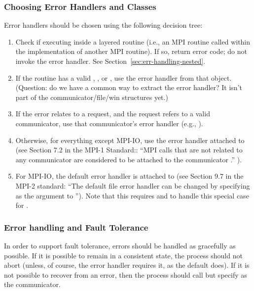\documentclass{article}
\begin{document}
\subsubsection{Choosing Error Handlers and Classes}
Error handlers should be chosen using the following decision tree:
\begin{enumerate}
\item Check if executing inside a layered routine (i.e., an MPI routine called
  within the implementation of another MPI routine).  If so, return error
  code; do not invoke the error handler.  See
  Section~\ref{sec:err-handling-nested}. 
\item If the routine has a valid , , or
  , use the error handler from that object.  (Question: do we
  have a common way to extract the error handler?  It isn't part of the
  communicator/file/win structures yet.)
\item If the error relates to a request, and the request refers to a valid
  communicator, use that communicator's error handler (e.g., ).
\item Otherwise, for everything except MPI-IO, use the error handler attached
  to   
  (see Section 7.2 in the MPI-1 Standard:: ``MPI calls that are not related to
  any communicator are considered to be attached to the communicator
  .'' ).
\item For MPI-IO, the default error handler is attached to
   (see Section 9.7 in the MPI-2 standard: ``The default
  file error handler can be changed by specifying  as the
   argument to '').  Note that this
  requires  and
   to handle this special case for
  . 
\end{enumerate}

 

\subsubsection{Error handling and Fault Tolerance}
\label{sec:errs-and-faults}
In order to support fault tolerance, errors should be handled as
gracefully as possible.  If it is possible to remain in a consistent
state, the process should not abort (unless, of course, the error
handler requires it, as the default  does).  
If it is not possible to recover from an error, then the process
should call  but specify  as the
communicator.  
\end{document}
